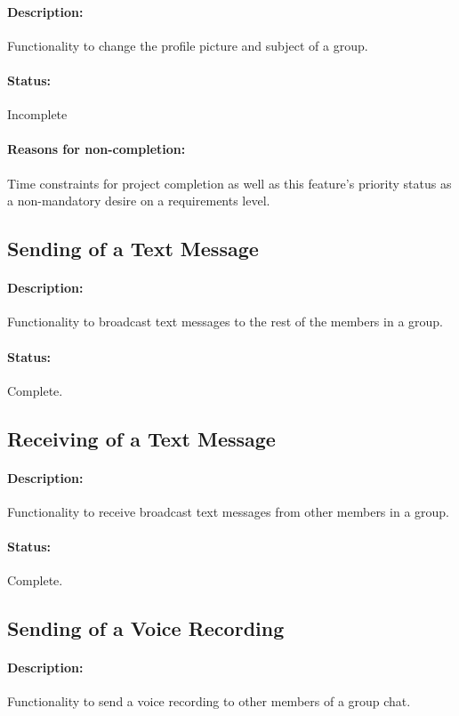 \documentclass[11pt]{article}
\begin{document}
\paragraph{Description:} Functionality to change the profile picture and subject of a group.
\paragraph{Status:} Incomplete
\paragraph{Reasons for non-completion:} Time constraints for project completion as well as this feature's priority status as a non-mandatory desire on a requirements level.

\subsection{Sending of a Text Message}
\paragraph{Description:} Functionality to broadcast text messages to the rest of the members in a group.
\paragraph{Status:} Complete.

\subsection{Receiving of a Text Message}
\paragraph{Description:} Functionality to receive broadcast text messages from other members in a group.
\paragraph{Status:} Complete.

\subsection{Sending of a Voice Recording}
\paragraph{Description:} Functionality to send a voice recording to other members of a group chat.
\end{document}
